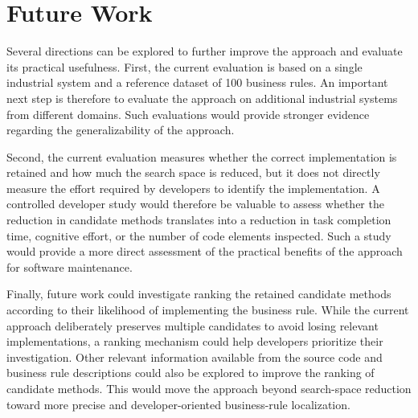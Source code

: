 \section{Future Work}

Several directions can be explored to further improve the approach and evaluate its practical usefulness. First, the current evaluation is based on a single industrial system and a reference dataset of 100 business rules. An important next step is therefore to evaluate the approach on additional industrial systems from different domains. Such evaluations would provide stronger evidence regarding the generalizability of the approach.

Second, the current evaluation measures whether the correct implementation is retained and how much the search space is reduced, but it does not directly measure the effort required by developers to identify the implementation. A controlled developer study would therefore be valuable to assess whether the reduction in candidate methods translates into a reduction in task completion time, cognitive effort, or the number of code elements inspected. Such a study would provide a more direct assessment of the practical benefits of the approach for software maintenance.

Finally, future work could investigate ranking the retained candidate methods according to their likelihood of implementing the business rule. While the current approach deliberately preserves multiple candidates to avoid losing relevant implementations, a ranking mechanism could help developers prioritize their investigation. Other relevant information available from the source code and business rule descriptions could also be explored to improve the ranking of candidate methods. This would move the approach beyond search-space reduction toward more precise and developer-oriented business-rule localization.